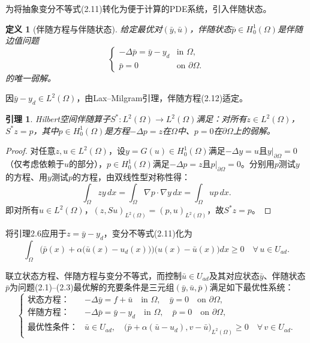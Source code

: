 \documentclass{xmu}
\theoremstyle{plain}
\newtheorem{lemma}[theorem]{引理}
\newtheorem{definition}[theorem]{定义}
\theoremstyle{remark}
\begin{document}
为将抽象变分不等式(2.11)转化为便于计算的PDE系统，引入伴随状态。

\begin{definition}[伴随方程与伴随状态]
给定最优对$(\bar{y}, \bar{u})$，伴随状态$\bar{p} \in H^1_0(\Omega)$是伴随边值问题
\begin{equation}
\begin{cases}
-\Delta \bar{p} = \bar{y} - y_d & \text{in } \Omega, \\
\bar{p} = 0 & \text{on } \partial\Omega.
\end{cases}
\end{equation}
的唯一弱解。
\end{definition}

因$\bar{y} - y_d \in L^2(\Omega)$，由Lax–Milgram引理，伴随方程(2.12)适定。

\begin{lemma}
Hilbert空间伴随算子$S^* : L^2(\Omega) \to L^2(\Omega)$满足：对所有$z \in L^2(\Omega)$，$S^* z = p$，其中$p \in H^1_0(\Omega)$是方程$-\Delta p = z$在$\Omega$中、$p = 0$在$\partial\Omega$上的弱解。
\end{lemma}

\begin{proof}
对任意$z, u \in L^2(\Omega)$，设$y = G(u) \in H^1_0(\Omega)$满足$-\Delta y = u$且$y|_{\partial\Omega} = 0$（仅考虑依赖于$u$的部分），$p \in H^1_0(\Omega)$满足$-\Delta p = z$且$p|_{\partial\Omega} = 0$。分别用$p$测试$y$的方程、用$y$测试$p$的方程，由双线性型对称性得：
$$ \int_\Omega z y \, dx = \int_\Omega \nabla p \cdot \nabla y \, dx = \int_\Omega u p \, dx. $$
即对所有$u \in L^2(\Omega)$，$(z, Su)_{L^2(\Omega)} = (p, u)_{L^2(\Omega)}$，故$S^* z = p$。
\end{proof}

将引理2.6应用于$z = \bar{y} - y_d$，变分不等式(2.11)化为
\begin{equation}
\int_\Omega \bigl( \bar{p}(x) + \alpha\bigl(\bar{u}(x) - u_d(x)\bigr) \bigr) \bigl( u(x) - \bar{u}(x) \bigr) dx \ge 0 \quad \forall\, u \in U_{ad}.
\end{equation}

联立状态方程、伴随方程与变分不等式，而控制$\bar{u} \in U_{ad}$及其对应状态$\bar{y}$、伴随状态$\bar{p}$为问题(2.1)–(2.3)最优解的充要条件是三元组$(\bar{y}, \bar{u}, \bar{p})$满足如下最优性系统：
\begin{equation}
\begin{cases}
\textbf{状态方程：} & -\Delta \bar{y} = f + \bar{u} \quad \text{in } \Omega, \quad \bar{y} = 0 \quad \text{on } \partial\Omega, \\[4pt]
\textbf{伴随方程：} & -\Delta \bar{p} = \bar{y} - y_d \quad \text{in } \Omega, \quad \bar{p} = 0 \quad \text{on } \partial\Omega, \\[4pt]
\textbf{最优性条件：} & \bar{u} \in U_{ad}, \quad \bigl( \bar{p} + \alpha(\bar{u} - u_d), v - \bar{u} \bigr)_{L^2(\Omega)} \ge 0 \quad \forall\, v \in U_{ad}.
\end{cases}
\end{equation}
\end{document}
